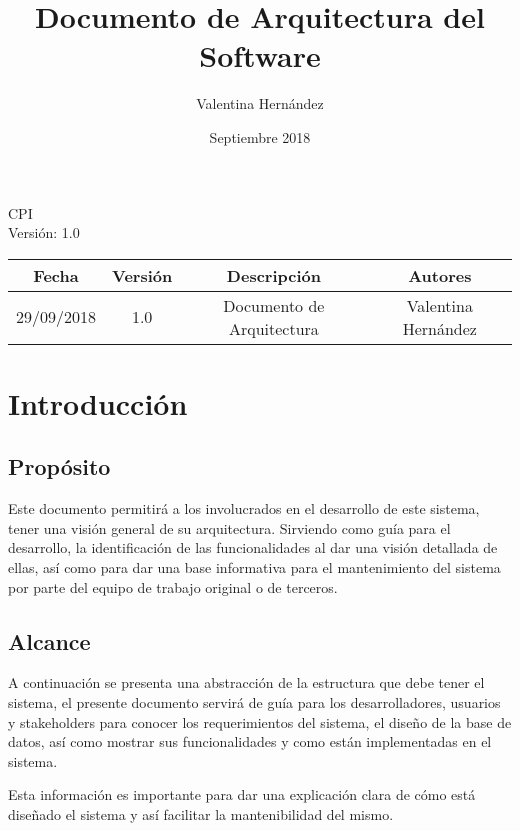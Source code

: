 \documentclass{article}
\title{Documento de Arquitectura del Software} \let\Title\@title
\date{Septiembre 2018} \let\Date\@date
\author{Valentina Hernández} \let\Author\@author
\begin{document}
    \begin{titlepage}
        \huge{\Title}
        \begin{flushright}
            \Large{CPI \\ Versión: 1.0}
        \end{flushright}
    \end{titlepage}

    \restoregeometry

    \newpage
    \tableofcontents

    \newpage
    \begin{center}
        \begin{tabular}{ |c|c|c|c| }
            \hline
            \rowcolor{blue!25}
            Fecha & Versión & Descripción & Autores \\ [0.5ex]
            \hline\hline
            29/09/2018 & 1.0 & Documento de Arquitectura & Valentina Hernández \\
            \hline
        \end{tabular}
    \end{center}

    \newpage
    \section{Introducción}
    \subsection{Propósito}
    Este documento permitirá a los involucrados en el desarrollo de este sistema, tener una visión general de su arquitectura. Sirviendo como guía para el desarrollo, la identificación de las funcionalidades al dar una visión detallada de ellas, así como para dar una base informativa para el mantenimiento del sistema por parte del equipo de trabajo original o de terceros.

    \subsection{Alcance}
    A continuación se presenta una abstracción de la estructura que debe tener el sistema, el presente documento servirá de guía para los desarrolladores, usuarios y stakeholders para conocer los requerimientos del sistema, el diseño de la base de datos, así como mostrar sus funcionalidades y como están implementadas en el sistema. 
 
    Esta información es importante para dar una explicación clara de cómo está diseñado el sistema y así facilitar la mantenibilidad del mismo.
\end{document}
